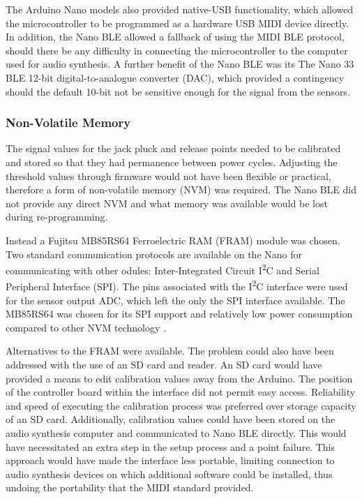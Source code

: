 The Arduino Nano models also provided native-USB functionality, which allowed the microcontroller to be programmed as a hardware USB MIDI device directly. In addition, the Nano BLE allowed a fallback of using the MIDI BLE protocol, should there be any difficulty in connecting the microcontroller to the computer used for audio synthesis. A further benefit of the Nano BLE was its The Nano 33 BLE 12-bit digital-to-analogue converter (DAC), which provided a contingency should the default 10-bit not be sensitive enough for the signal from the sensors.


\subsubsection{Non-Volatile Memory}\label{eeprom-nvram-fram} 

The signal values for the jack pluck and release points needed to be calibrated and stored so that they had permanence between power cycles. Adjusting the threshold values through firmware would not have been flexible or practical, therefore a form of non-volatile memory (NVM) was required.  The Nano BLE did not provide any direct NVM and what memory was available would be lost during re-programming.

Instead a Fujitsu MB85RS64 Ferroelectric RAM (FRAM) module was chosen. Two standard communication protocols are available on the Nano for communicating with other odules: Inter-Integrated Circuit I\textsuperscript{2}C and  Serial Peripheral Interface (SPI). The pins associated with the  I\textsuperscript{2}C interface were used for the sensor output ADC, which left the only the SPI interface available. The MB85RS64 was chosen for its SPI support and relatively low power consumption compared to other NVM technology \cite{fujitsu_fram_2011}.

Alternatives to the FRAM were available. The problem could also have been addressed with the use of an SD card and reader. An SD card would have provided a means to edit calibration values away from the Arduino. The position of the controller board within the interface did not permit easy access. Reliability and speed of executing the calibration process was preferred over storage capacity of an SD card. Additionally, calibration values could have been stored on the audio synthesis computer and communicated to Nano BLE directly. This would have necessitated an extra step in the setup process and a point failure. This approach would have made the interface less portable, limiting connection to audio synthesis devices on which additional software could be installed, thus undoing the portability that the MIDI standard provided.


